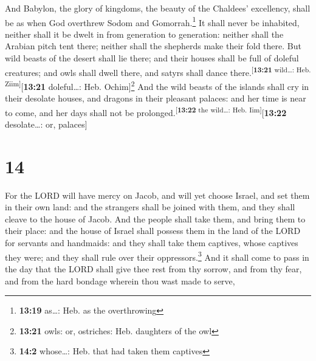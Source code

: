  And Babylon, the glory of kingdoms, the beauty of the
Chaldees' excellency, shall be as when God overthrew Sodom and
Gomorrah.\footnote{\textbf{13:19} as\ldots: Heb. as the overthrowing}
 It shall never be inhabited, neither shall it be dwelt
in from generation to generation: neither shall the Arabian pitch tent
there; neither shall the shepherds make their fold there.
 But wild beasts of the desert shall lie there; and their
houses shall be full of doleful creatures; and owls shall dwell there,
and satyrs shall dance there.\textsuperscript{{[}\textbf{13:21}
wild\ldots: Heb. Ziim{]}}{[}\textbf{13:21} doleful\ldots: Heb.
Ochim{]}\footnote{\textbf{13:21} owls: or, ostriches: Heb. daughters of
  the owl}  And the wild beasts of the islands shall cry
in their desolate houses, and dragons in their pleasant palaces: and her
time is near to come, and her days shall not be
prolonged.\textsuperscript{{[}\textbf{13:22} the wild\ldots: Heb.
Iim{]}}{[}\textbf{13:22} desolate\ldots: or, palaces{]}

\hypertarget{section-13}{%
\section{14}\label{section-13}}

 For the LORD will have mercy on Jacob, and will yet
choose Israel, and set them in their own land: and the strangers shall
be joined with them, and they shall cleave to the house of Jacob.
 And the people shall take them, and bring them to their
place: and the house of Israel shall possess them in the land of the
LORD for servants and handmaids: and they shall take them captives,
whose captives they were; and they shall rule over their
oppressors.\footnote{\textbf{14:2} whose\ldots: Heb. that had taken them
  captives}  And it shall come to pass in the day that the
LORD shall give thee rest from thy sorrow, and from thy fear, and from
the hard bondage wherein thou wast made to serve,

